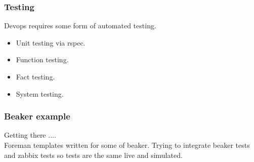 \documentclass{beamer}
\begin{document}
\begin{frame}
  \frametitle{Testing}
  Devops requires some form of automated testing.
  \begin{itemize}
    \item Unit testing via rspec.
    \item Function testing.
    \item Fact testing.
    \item System testing.
  \end{itemize}
\end{frame}

\begin{frame}
    \frametitle{Beaker example}
    Getting there .... \\
    Foreman templates written for some of beaker.
    Trying to integrate beaker tests and zabbix tests so tests are the same live and simulated.
\end{frame}
\end{document}
